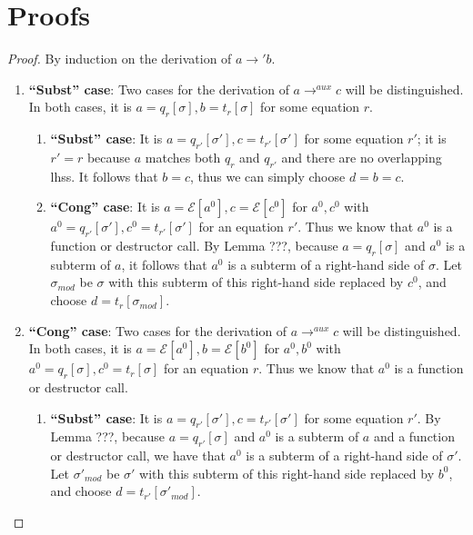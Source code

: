 \chapter{Proofs}

\cdpaux*
\begin{proof}
By induction on the derivation of $a \longrightarrow' b$.

\begin{enumerate}
\item \textbf{``Subst'' case}: Two cases for the derivation of $a \longrightarrow^{aux} c$ will be distinguished. In both cases, it is $a = q_r[\sigma], b = t_r[\sigma]$ for some equation $r$.

\begin{enumerate}
\item \textbf{``Subst'' case}: It is $a = q_{r'}[\sigma'], c = t_{r'}[\sigma']$ for some equation $r'$; it is $r' = r$ because $a$ matches both $q_r$ and $q_{r'}$ and there are no overlapping lhss. It follows that $b = c$, thus we can simply choose $d = b = c$.

\item \textbf{``Cong'' case}: It is $a = \mathcal{E}[a^0], c = \mathcal{E}[c^0]$ for $a^0, c^0$ with $a^0 = q_{r'}[\sigma'], c^0 = t_{r'}[\sigma']$ for an equation $r'$. Thus we know that $a^0$ is a function or destructor call. By Lemma ???, because $a = q_r[\sigma]$ and $a^0$ is a subterm of $a$, it follows that $a^0$ is a subterm of a right-hand side of $\sigma$. Let $\sigma_{mod}$ be $\sigma$ with this subterm of this right-hand side replaced by $c^0$, and choose $d = t_r[\sigma_{mod}]$.
\end{enumerate}

\item \textbf{``Cong'' case}: Two cases for the derivation of $a \longrightarrow^{aux} c$ will be distinguished. In both cases, it is $a = \mathcal{E}[a^0], b = \mathcal{E}[b^0]$ for $a^0, b^0$ with $a^0 = q_r[\sigma], c^0 = t_r[\sigma]$ for an equation $r$. Thus we know that $a^0$ is a function or destructor call.

\begin{enumerate}
\item \textbf{``Subst'' case}: It is $a = q_{r'}[\sigma'], c = t_{r'}[\sigma']$ for some equation $r'$. By Lemma ???, because $a = q_{r'}[\sigma]$ and $a^0$ is a subterm of $a$ and a function or destructor call, we have that $a^0$ is a subterm of a right-hand side of $\sigma'$. Let $\sigma'_{mod}$ be $\sigma'$ with this subterm of this right-hand side replaced by $b^0$, and choose $d = t_{r'}[\sigma'_{mod}]$.


\end{enumerate}
\end{enumerate}
\end{proof}
